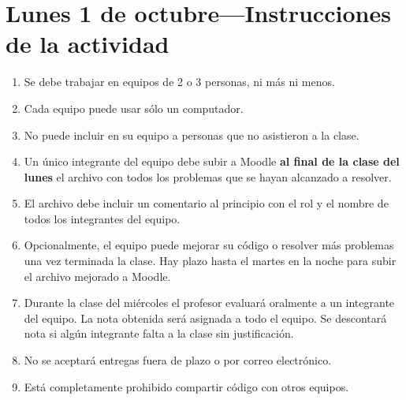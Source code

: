 \documentclass[12pt,spanish]{article}
\begin{document}
  \thispagestyle{empty}
  \pagestyle{empty}
  \section*{Lunes 1 de octubre---Instrucciones de la actividad}

  \begin{enumerate}[leftmargin=0pt]

    \item
      Se debe trabajar en equipos de 2 o 3 personas,
      ni más ni menos.

    \item
      Cada equipo puede usar sólo un computador.

    \item
      No puede incluir en su equipo
      a personas que no asistieron a la clase.

    \item
      Un único integrante del equipo debe subir a Moodle
      \textbf{al final de la clase del lunes}
      el archivo con todos los problemas que se hayan alcanzado a resolver.

    \item
      El archivo debe incluir un comentario al principio
      con el rol y el nombre de todos los integrantes del equipo.

    \item
      Opcionalmente,
      el equipo puede mejorar su código o resolver más problemas
      una vez terminada la clase.
      Hay plazo hasta el martes en la noche
      para subir el archivo mejorado a Moodle.

    \item
      Durante la clase del miércoles
      el profesor evaluará oralmente a un integrante del equipo.
      La nota obtenida será asignada a todo el equipo.
      Se descontará nota si algún integrante
      falta a la clase sin justificación.

    \item
      No se aceptará entregas fuera de plazo o por correo electrónico.

    \item
      Está completamente prohibido compartir código con otros equipos.

  \end{enumerate}
\end{document}
